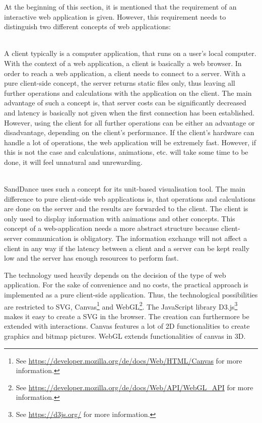 At the beginning of this section, it is mentioned that the requirement of an interactive web application is given. However, this requirement needs to distinguish two different concepts of web applications:
\begin{enumerate}

 \hfill \\
A client typically is a computer application, that runs on a user's local computer. With the context of a web application, a client is basically a web browser. In order to reach a web application, a client needs to connect to a server. With a pure client-side concept, the server returns static files only, thus leaving all further operations and calculations with the application on the client. The main advantage of such a concept is, that server costs can be significantly decreased and latency is basically not given when the first connection has been established. However, using the client for all further operations can be either an advantage or disadvantage, depending on the client's performance. If the client's hardware can handle a lot of operations, the web application will be extremely fast. However, if this is not the case and calculations, animations, etc. will take some time to be done, it will feel unnatural and unrewarding.

 \hfill \\
SandDance uses such a concept for its unit-based visualisation tool. The main difference to pure client-side web applications is, that operations and calculations are done on the server and the results are forwarded to the client. The client is only used to display information with animations and other concepts. This concept of a web-application needs a more abstract structure because client-server communication is obligatory. The information exchange will not affect a client in any way if the latency between a client and a server can be kept really low and the server has enough resources to perform fast.
\end{enumerate}

The technology used heavily depends on the decision of the type of web application. For the sake of convenience and no costs, the practical approach is implemented as a pure client-side application. Thus, the technological possibilities are restricted to \ac{SVG}, Canvas\footnote{See \href{https://developer.mozilla.org/de/docs/Web/HTML/Canvas}{https://developer.mozilla.org/de/docs/Web/HTML/Canvas} for more information.} and WebGL\footnote{See \href{https://developer.mozilla.org/de/docs/Web/API/WebGL_API}{https://developer.mozilla.org/de/docs/Web/API/WebGL\_API} for more information.}. The JavaScript library D3.js\footnote{See \href{https://d3js.org/}{https://d3js.org/} for more information.} makes it easy to create a \ac{SVG} in the browser. The creation can furthermore be extended with interactions. Canvas features a lot of 2D functionalities to create graphics and bitmap pictures. WebGL extends functionalities of canvas in 3D.